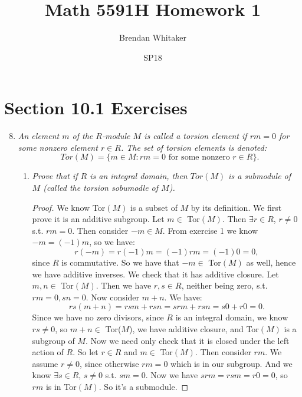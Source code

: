 \documentclass[10pt,oneside,reqno]{amsart}
\theoremstyle{plain}
\theoremstyle{definition}
\theoremstyle{remark}
\begin{document}
\title{Math 5591H Homework 1}

\date{SP18}

\author[Brendan Whitaker]{Brendan Whitaker}

\maketitle



\section*{Section 10.1 Exercises}



\begin{enumerate}[label=\arabic*.]
\setcounter{enumi}{7}
\item \textit{An element $m$ of the $R$-module $M$ is called a torsion element if $rm = 0$ for some nonzero element $r \in R$. The set of torsion elements is denoted: }
$$
Tor(M) = \{m \in M:rm = 0 \text{ for some nonzero } r \in R\}. 
$$

\begin{enumerate}
\item \textit{Prove that if $R$ is an integral domain, then $Tor(M)$ is a submodule of $M$ (called the torsion sobumodle of $M$). }
\begin{proof}
We know Tor$(M)$ is a subset of $M$ by its definition. We first prove it is an additive subgroup. Let $m \in $ Tor$(M)$. Then $\exists r \in R$, $r \neq 0$ s.t. $rm = 0$. Then consider $-m \in M$. From exercise 1 we know 
$
-m = (-1)m$, so we have:
$$
r(-m) = r(-1)m = (-1)rm = (-1)0 = 0,
$$
 since $R$ is commutative. So we have that $-m \in $ Tor$(M)$ as well, hence we have additive inverses. We check that it has additive closure. Let $m,n \in $ Tor$(M)$. Then we have $r,s \in R$, neither being zero, s.t. $rm = 0, sn = 0$. Now consider $m + n$. We have:
$$
rs(m + n) = rsm + rsn = srm + rsn = s0 + r0 = 0.
$$
Since we have no zero divisors, since $R$ is an integral domain, we know $rs \neq 0$, so $m  +n \in $ Tor($M$), we have additive closure, and Tor$(M)$ is a subgroup of $M$. Now we need only check that it is closed under the left action of $R$. So let $r \in R$ and $m \in $ Tor$(M)$. Then consider $rm$. We assume $r \neq 0$, since otherwise $rm = 0$ which is in our subgroup. And we know $\exists s \in R$, $s \neq 0$ s.t. $sm = 0$. Now we have $srm = rsm = r0 = 0$, so $rm$ is in Tor$(M)$. So it's a submodule. 
\end{proof}


\end{enumerate}
\end{enumerate}
\end{document}
